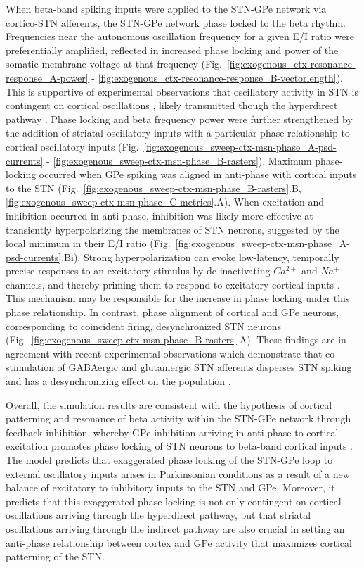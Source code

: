 %
%
%
%
%
When beta-band spiking inputs were applied to the STN-GPe network via cortico-STN afferents, the STN-GPe network phase locked to the beta rhythm. Frequencies near the autonomous oscillation frequency for a given E/I ratio were preferentially amplified, reflected in increased phase locking and power of the somatic membrane voltage at that frequency (Fig.~\ref{fig:exogenous_ctx-resonance-response_A-power} - \ref{fig:exogenous_ctx-resonance-response_B-vectorlength}). This is supportive of experimental observations that oscillatory activity in STN is contingent on cortical oscillations \cite{magill_dopamine_2001}, likely transmitted though the hyperdirect pathway \cite{tachibana_subthalamo-pallidal_2011}. Phase locking and beta frequency power were further strengthened by the addition of striatal oscillatory inputs with a particular phase relationship to cortical oscillatory inputs (Fig.~\ref{fig:exogenous_sweep-ctx-msn-phase_A-psd-currents} - \ref{fig:exogenous_sweep-ctx-msn-phase_B-rasters}).
Maximum phase-locking occurred when GPe spiking was aligned in anti-phase with cortical inputs to the STN (Fig.~\ref{fig:exogenous_sweep-ctx-msn-phase_B-rasters}.B, \ref{fig:exogenous_sweep-ctx-msn-phase_C-metrics}.A). When excitation and inhibition occurred in anti-phase, inhibition was likely more effective at transiently hyperpolarizing the membranes of STN neurons, suggested by the local minimum in their E/I ratio (Fig.~\ref{fig:exogenous_sweep-ctx-msn-phase_A-psd-currents}.Bi). Strong hyperpolarization can evoke low-latency, temporally precise responses to an excitatory stimulus by de-inactivating $Ca^{2+}$ and $Na^{+}$ channels, and thereby priming them to respond to excitatory cortical inputs \cite{bevan_gabaergic_2007}. This mechanism may be responsible for the increase in phase locking under this phase relationship.
In contrast, phase alignment of cortical and GPe neurons, corresponding to coincident firing, desynchronized STN neurons (Fig.~\ref{fig:exogenous_sweep-ctx-msn-phase_B-rasters}.A). These findings are in agreement with recent experimental observations which demonstrate that co-stimulation of GABAergic and glutamergic STN afferents disperses STN spiking and has a desynchronizing effect on the population \cite{steiner_connectivity_2019}.

Overall, the simulation results are consistent with the hypothesis of cortical patterning and resonance of beta activity within the STN-GPe network through feedback inhibition, whereby GPe inhibition arriving in anti-phase to cortical excitation promotes phase locking of STN neurons to beta-band cortical inputs \cite{baufreton_enhancement_2005}. The model predicts that exaggerated phase locking of the STN-GPe
loop to external oscillatory inputs arises in Parkinsonian conditions as a result of a new balance of excitatory to inhibitory inputs to the STN and GPe.
Moreover, it predicts that this exaggerated phase locking is not only contingent on cortical
oscillations arriving through the hyperdirect pathway, but that striatal oscillations arriving
through the indirect pathway are also crucial in setting an anti-phase relationship
between cortex and GPe activity that maximizes cortical patterning of the STN.
%

